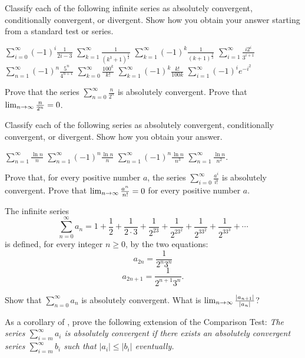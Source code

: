 \begin{exercises}

Classify each of the following infinite series as
absolutely convergent, conditionally convergent,
or divergent.
Show how you obtain your answer starting from
a standard test or series.
\begin{exenum}
\x
$\sum_{i=0}^\infty (-1)^i \frac{1}{2i-3}$
\x
$\sum_{k=1}^\infty \frac{1}{(k^3+1)^{\frac12}}$
\x
$\sum_{k=1}^\infty (-1)^k \frac{1}{(k+1)^{\frac23}}$
\x
$\sum_{i=1}^\infty \frac{i2^i}{3^{i+1}}$
\x
$\sum_{n=1}^\infty (-1)^n \frac{5^n}{4^{n+1}}$
\x
$\sum_{k=0}^\infty \frac{100^k}{k!}$
\x
$\sum_{k=1}^\infty (-1)^k \frac{k!}{100k}$
\x
$\sum_{i=1}^\infty (-1)^i e^{-i^2}$
\end{exenum}

\begin{exenum}
\x
Prove that the series
$\sum_{n=0}^\infty \frac{n}{2^n}$
is absolutely convergent.
\x
Prove that $\lim_{n\rightarrow\infty} \frac{n}{2^n} = 0$.
\end{exenum}

Classify each of the following series as
absolutely convergent, conditionally convergent,
or divergent.
Show how you obtain your answer.
\begin{exenum}
\x
$\sum_{n=1}^\infty \frac{\ln n}n$
\x
$\sum_{n=1}^\infty (-1)^n \frac{\ln n}n$
\x
$\sum_{n=1}^\infty (-1)^n \frac{\ln n}{n^3}$
\x
$\sum_{n=1}^\infty \frac{\ln n}{n^2}$.
\end{exenum}

\begin{exenum}
\x
Prove that, for every positive number $a$,
the series $\sum_{i=0}^\infty \frac{a^i}{i!}$
is absolutely convergent.
\x
Prove that $\lim_{n\rightarrow\infty} \frac{a^n}{n!} = 0$
for every positive number $a$.
\end{exenum}

The infinite series
\[
\sum_{n=0}^\infty a_n = 1 + \frac12 + \frac1{2\cdot3} +
\frac1{2^23} + \frac1{2^23^2} + \frac1{2^33^2} +
\frac1{2^33^3} + \cdots
\]
is defined, for every integer $n\geq0$,
by the two equations:
\[
a_{2n} = \frac1{2^n3^n}
\]
\[
a_{2n+1} = \frac1{2^{n+1}3^n}
.
\]
\begin{exenum}
\x
Show that $\sum_{n=0}^\infty a_n$
is absolutely convergent.
\x
What is $\lim_{n\rightarrow\infty}
\frac{|a_{n+1}|}{|a_n|}$?
\end{exenum}

As a corollary of , prove the following
extension of the Comparison Test:
\emph{The series $\sum_{i=m}^\infty a_i$
is absolutely convergent if there exists an
absolutely convergent series $\sum_{i=m}^\infty b_i$
such that $|a_i| \leq |b_i|$ eventually.}

\end{exercises}
